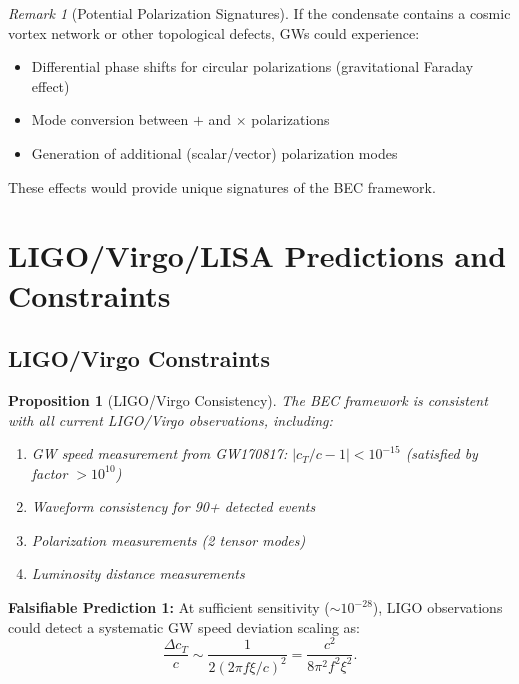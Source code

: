 \documentclass[11pt,a4paper]{article}
\newcommand{\cT}{\ensuremath{c_T}}
\newtheorem{proposition}[theorem]{Proposition}
\theoremstyle{definition}
\theoremstyle{remark}
\newtheorem{remark}[theorem]{Remark}
\begin{document}
\begin{remark}[Potential Polarization Signatures]
If the condensate contains a cosmic vortex network or other topological defects, GWs could experience:
\begin{itemize}
\item Differential phase shifts for circular polarizations (gravitational Faraday effect)
\item Mode conversion between $+$ and $\times$ polarizations
\item Generation of additional (scalar/vector) polarization modes
\end{itemize}
These effects would provide unique signatures of the BEC framework.
\end{remark}

\section{LIGO/Virgo/LISA Predictions and Constraints}
\label{sec:detector_predictions}

\subsection{LIGO/Virgo Constraints}
\label{sec:ligo_virgo}

\begin{proposition}[LIGO/Virgo Consistency]
\label{prop:ligo_consistency}
The BEC framework is consistent with all current LIGO/Virgo observations, including:
\begin{enumerate}[label=(\alph*)]
\item GW speed measurement from GW170817: $|\cT/c - 1| < 10^{-15}$ (satisfied by factor $>10^{10}$)
\item Waveform consistency for 90+ detected events
\item Polarization measurements (2 tensor modes)
\item Luminosity distance measurements
\end{enumerate}
\end{proposition}

\textbf{Falsifiable Prediction 1:} At sufficient sensitivity ($\sim 10^{-28}$), LIGO observations could detect a systematic GW speed deviation scaling as:
\begin{equation}
\frac{\Delta \cT}{c} \sim \frac{1}{2(2\pi f\xi/c)^2} = \frac{c^2}{8\pi^2 f^2 \xi^2}.
\end{equation}
\end{document}
